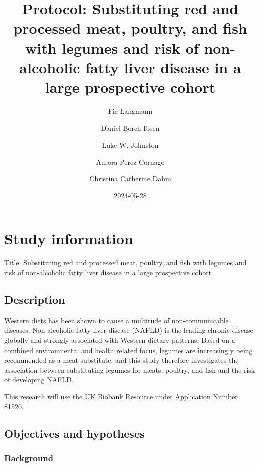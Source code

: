 \documentclass[
  11pt,
  a4paper,
  DIV=11,
  numbers=noendperiod,
  twocolumn]{scrartcl}
\title{Protocol: Substituting red and processed meat, poultry, and fish
with legumes and risk of non-alcoholic fatty liver disease in a large
prospective cohort}
\author{Fie Langmann \and Daniel Borch Ibsen \and Luke W.
Johnston \and Aurora Perez-Cornago \and Christina Catherine Dahm}
\date{2024-05-28}
\begin{document}
\maketitle
\ifdefined\Shaded\renewenvironment{Shaded}{\begin{tcolorbox}[boxrule=0pt, enhanced, borderline west={3pt}{0pt}{shadecolor}, breakable, interior hidden, frame hidden, sharp corners]}{\end{tcolorbox}}\fi

\hypertarget{study-information}{%
\section{Study information}\label{study-information}}

Title: Substituting red and processed meat, poultry, and fish with
legumes and risk of non-alcoholic fatty liver disease in a large
prospective cohort

\hypertarget{description}{%
\subsection{Description}\label{description}}

Western diets has been shown to cause a multitude of non-communicable
diseases. Non-alcoholic fatty liver disease (NAFLD) is the leading
chronic disease globally and strongly associated with Western dietary
patterns. Based on a combined environmental and health related focus,
legumes are increasingly being recommended as a meat substitute, and
this study therefore investigates the association between substituting
legumes for meats, poultry, and fish and the risk of developing NAFLD.

This research will use the UK Biobank Resource under Application Number
81520.

\hypertarget{objectives-and-hypotheses}{%
\subsection{Objectives and hypotheses}\label{objectives-and-hypotheses}}

\hypertarget{background}{%
\subsubsection{Background}\label{background}}
\end{document}
